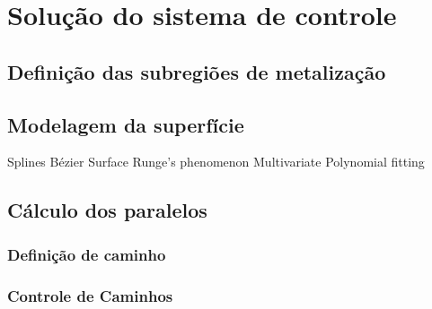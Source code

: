 \section{Solução do sistema de controle}


\subsection{Definição das subregiões de metalização}

\subsection{Modelagem da superfície}

Splines
Bézier Surface
Runge's phenomenon
Multivariate Polynomial fitting

\subsection{Cálculo dos paralelos}

\subsubsection{Definição de caminho}


\subsubsection{Controle de Caminhos}
